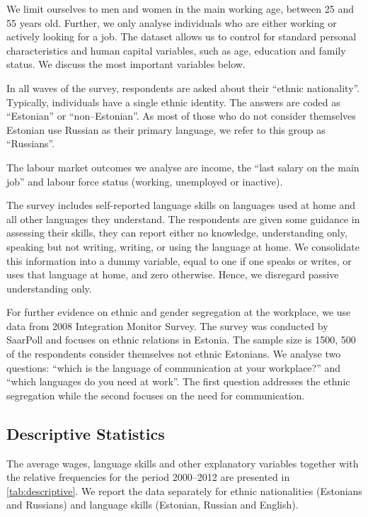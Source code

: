 \documentclass[12pt, a4paper]{article}
\begin{document}
We limit ourselves to men and women in the main working age, between 25 and
55 years old. Further, we only analyse
individuals who are either working or actively looking for a job.
The dataset allows us to control for standard personal
characteristics and human capital variables, such as age, education
and family status. We discuss the most important variables below.

In all waves of the survey, respondents are asked about their
``ethnic nationality''. Typically, individuals have a single ethnic
identity. The answers are coded as ``Estonian'' or
``non--Estonian''. As most of those who do not consider themselves
Estonian use Russian as their primary language, we refer to this group
as ``Russians''.                                  
              
The labour market outcomes we analyse are income, the ``last salary on the main job'' and
labour force status (working, unemployed or inactive). 
                                  
The survey includes self-reported language skills on languages used at
home and all other languages they understand. The respondents are
given some guidance in assessing their skills, they can report either
no knowledge, understanding only, speaking but not writing, writing, or using the
language at home. We consolidate this information into a dummy variable, equal
to one if one speaks or writes, or uses that language at
home, and zero otherwise. Hence, we disregard passive understanding
only.

For further evidence on ethnic and gender segregation at the workplace, we use data
from 2008 Integration Monitor Survey. The survey was conducted by
SaarPoll and focuses on
ethnic relations in Estonia. The sample size is 1500,
500 of the respondents consider themselves not ethnic Estonians. We analyse
two questions: ``which is the language of communication at your
workplace?'' and ``which languages do you need at work''. The first
question addresses the ethnic segregation while the second focuses on
the need for communication.


\subsection{Descriptive Statistics}
\label{sec:descriptive}

The average wages, language skills and other explanatory variables together with the relative frequencies for the period 2000--2012 are presented in \cref{tab:descriptive}. We report the data separately for ethnic nationalities (Estonians and Russians) and language
skills (Estonian, Russian and English).
\end{document}

